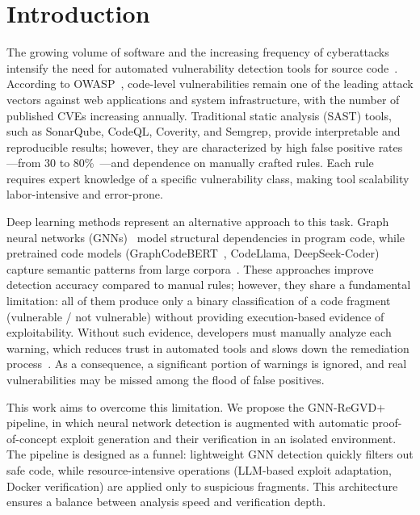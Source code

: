 \documentclass[runningheads]{llncs}
\begin{document}
\section{Introduction}

The growing volume of software and the increasing frequency of cyberattacks intensify the need for automated vulnerability detection tools for source code~\cite{nist800}. According to OWASP~\cite{owasp2024}, code-level vulnerabilities remain one of the leading attack vectors against web applications and system infrastructure, with the number of published CVEs increasing annually. Traditional static analysis (SAST) tools, such as SonarQube, CodeQL, Coverity, and Semgrep, provide interpretable and reproducible results; however, they are characterized by high false positive rates---from 30 to 80\%~\cite{sultana2024}---and dependence on manually crafted rules. Each rule requires expert knowledge of a specific vulnerability class, making tool scalability labor-intensive and error-prone.

Deep learning methods represent an alternative approach to this task. Graph neural networks (GNNs)~\cite{nguyen2022regvd,zhou2019devign} model structural dependencies in program code, while pretrained code models (GraphCodeBERT~\cite{guo2021graphcodebert}, CodeLlama, DeepSeek-Coder) capture semantic patterns from large corpora~\cite{ding2024}. These approaches improve detection accuracy compared to manual rules; however, they share a fundamental limitation: all of them produce only a binary classification of a code fragment (vulnerable / not vulnerable) without providing execution-based evidence of exploitability. Without such evidence, developers must manually analyze each warning, which reduces trust in automated tools and slows down the remediation process~\cite{gajjar2026vbf}. As a consequence, a significant portion of warnings is ignored, and real vulnerabilities may be missed among the flood of false positives.

This work aims to overcome this limitation. We propose the GNN-ReGVD+ pipeline, in which neural network detection is augmented with automatic proof-of-concept exploit generation and their verification in an isolated environment. The pipeline is designed as a funnel: lightweight GNN detection quickly filters out safe code, while resource-intensive operations (LLM-based exploit adaptation, Docker verification) are applied only to suspicious fragments. This architecture ensures a balance between analysis speed and verification depth.
\end{document}
